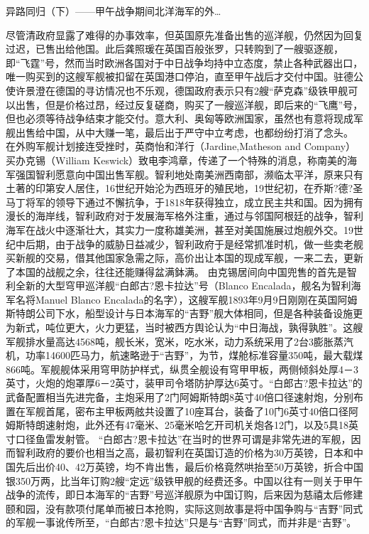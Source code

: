 \documentclass[12pt,UTF8]{ctexbook}
\begin{document}
异路同归（下）——甲午战争期间北洋海军的外…

尽管清政府显露了难得的办事效率，但英国原先准备出售的巡洋舰，仍然因为回复过迟，已售出给他国。此后龚照瑗在英国百般张罗，只转购到了一艘驱逐舰，即“飞霆”号，然而当时欧洲各国对于中日战争均持中立态度，禁止各种武器出口，唯一购买到的这艘军舰被扣留在英国港口停泊，直至甲午战后才交付中国。驻德公使许景澄在德国的寻访情况也不乐观，德国政府表示只有2艘“萨克森”级铁甲舰可以出售，但是价格过昂，经过反复磋商，购买了一艘巡洋舰，即后来的“飞鹰”号，但也必须等待战争结束才能交付。意大利、奥匈等欧洲国家，虽然也有意将现成军舰出售给中国，从中大赚一笔，最后出于严守中立考虑，也都纷纷打消了念头。
在外购军舰计划接连受挫时，英商怡和洋行（Jardine,Matheson and Company）买办克锡（William Keswick）致电李鸿章，传递了一个特殊的消息，称南美的海军强国智利愿意向中国出售军舰。智利地处南美洲西南部，濒临太平洋，原来只有土著的印第安人居住，16世纪开始沦为西班牙的殖民地，19世纪初，在乔斯?德?圣马丁将军的领导下通过不懈抗争，于1818年获得独立，成立民主共和国。因为拥有漫长的海岸线，智利政府对于发展海军格外注重，通过与邻国阿根廷的战争，智利海军在战火中逐渐壮大，其实力一度称雄美洲，甚至对美国施展过炮舰外交。19世纪中后期，由于战争的威胁日益减少，智利政府于是经常抓准时机，做一些卖老舰买新舰的交易，借其他国家急需之际，高价出让本国的现成军舰，一来二去，更新了本国的战舰之余，往往还能赚得盆满鉢满。
由克锡居间向中国兜售的首先是智利全新的大型穹甲巡洋舰“白郎古?恩卡拉达”号（Blanco Encalada，舰名为智利海军名将Manuel Blanco Encalada的名字），这艘军舰1893年9月9日刚刚在英国阿姆斯特朗公司下水，船型设计与日本海军的“吉野”舰大体相同，但是各种装备设施更为新式，吨位更大，火力更猛，当时被西方舆论认为“中日海战，孰得孰胜”。这艘军舰排水量高达4568吨，舰长米，宽米，吃水米，动力系统采用了2台3膨胀蒸汽机，功率14600匹马力，航速略逊于“吉野”，为节，煤舱标准容量350吨，最大载煤866吨。军舰舰体采用穹甲防护样式，纵贯全舰设有穹甲甲板，两侧倾斜处厚4－3英寸，火炮的炮罩厚6－2英寸，装甲司令塔防护厚达6英寸。“白郎古?恩卡拉达”的武备配置相当先进完备，主炮采用了2门阿姆斯特朗8英寸40倍口径速射炮，分别布置在军舰首尾，密布主甲板两舷共设置了10座耳台，装备了10门6英寸40倍口径阿姆斯特朗速射炮，此外还有47毫米、25毫米哈乞开司机关炮各12门，以及5具18英寸口径鱼雷发射管。
“白郎古?恩卡拉达”在当时的世界可谓是非常先进的军舰，因而智利政府的要价也相当之高，最初智利在英国订造的价格为30万英镑，日本和中国先后出价40、42万英镑，均不肯出售，最后价格竟然哄抬至50万英镑，折合中国银350万两，比当年订购2艘“定远”级铁甲舰的经费还多。中国以往有一则关于甲午战争的流传，即日本海军的“吉野”号巡洋舰原为中国订购，后来因为慈禧太后修建颐和园，没有款项付尾单而被日本抢购，实际这则故事是将中国争购与“吉野”同式的军舰一事讹传所至，“白郎古?恩卡拉达”只是与“吉野”同式，而并非是“吉野”。
\end{document}
